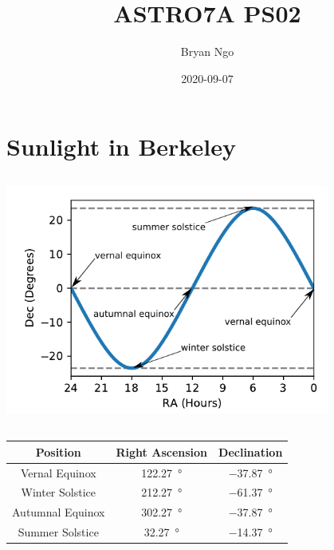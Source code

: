 \documentclass{article}
\title{ASTRO7A PS02}
\author{Bryan Ngo}
\date{2020-09-07}
\begin{document}
\maketitle

\section{Sunlight in Berkeley}

\subsection{}

\begin{center}
    \includegraphics[width=0.8\textwidth]{q1a.png}
\end{center}

\subsection{}

\begin{center}
    \begin{tabular}{||c|c|c||}
        \hline
        Position & Right Ascension & Declination \\
        \hline
        Vernal Equinox & \SI{122.27}{\degree} & \SI{-37.87}{\degree} \\
        Winter Solstice & \SI{212.27}{\degree} & \SI{-61.37}{\degree} \\
        Autumnal Equinox & \SI{302.27}{\degree} & \SI{-37.87}{\degree} \\
        Summer Solstice & \SI{32.27}{\degree} & \SI{-14.37}{\degree} \\
        \hline
    \end{tabular}
\end{center}
\end{document}
